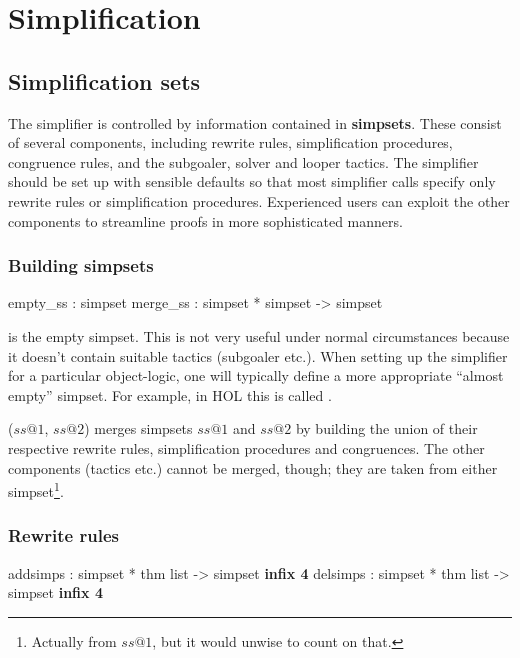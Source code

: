
\chapter{Simplification}
\label{chap:simplification}

\section{Simplification sets} 

The simplifier is controlled by information contained in {\bf
  simpsets}.  These consist of several components, including rewrite
rules, simplification procedures, congruence rules, and the subgoaler,
solver and looper tactics.  The simplifier should be set up with
sensible defaults so that most simplifier calls specify only rewrite
rules or simplification procedures.  Experienced users can exploit the
other components to streamline proofs in more sophisticated manners.

\subsection{Building simpsets}
\begin{ttbox}
empty_ss : simpset
merge_ss : simpset * simpset -> simpset
\end{ttbox}
\begin{ttdescription}
  
\item[\ttindexbold{empty_ss}] is the empty simpset.  This is not very useful
  under normal circumstances because it doesn't contain suitable tactics
  (subgoaler etc.).  When setting up the simplifier for a particular
  object-logic, one will typically define a more appropriate ``almost empty''
  simpset.  For example, in HOL this is called .
  
\item[\ttindexbold{merge_ss} ($ss@1$, $ss@2$)] merges simpsets $ss@1$
  and $ss@2$ by building the union of their respective rewrite rules,
  simplification procedures and congruences.  The other components
  (tactics etc.) cannot be merged, though; they are taken from either
  simpset\footnote{Actually from $ss@1$, but it would unwise to count
    on that.}.

\end{ttdescription}


\subsection{Rewrite rules}
\begin{ttbox}
addsimps : simpset * thm list -> simpset \hfill{\bf infix 4}
delsimps : simpset * thm list -> simpset \hfill{\bf infix 4}
\end{ttbox}

